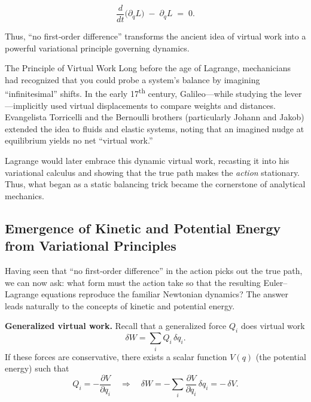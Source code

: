 \[
\frac{d}{dt}\!\bigl(\partial_{\dot q}L\bigr)
\;-\;\partial_{q}L
\;=\;
0.
\]

Thus, “no first‐order difference” transforms the ancient idea of virtual work into a powerful variational principle governing dynamics.  



\medskip

\begin{HistoricalSidebar}{The Principle of Virtual Work}
  Long before the age of Lagrange, mechanicians had recognized that you could probe a system’s balance by 
  imagining “infinitesimal” shifts.  In the early 17\textsuperscript{th} century, Galileo—while studying 
  the lever—implicitly used virtual displacements to compare weights and distances.  Evangelista Torricelli 
  and the Bernoulli brothers (particularly Johann and Jakob) extended the idea to fluids and elastic 
  systems, noting that an imagined nudge at equilibrium yields no net “virtual work.”  

  \medskip

  Lagrange would later embrace this dynamic virtual work, recasting it into his variational calculus and 
  showing that the true path makes the \emph{action} stationary.  Thus, what began as a static balancing 
  trick became the cornerstone of analytical mechanics.
\end{HistoricalSidebar}



\subsection{Emergence of Kinetic and Potential Energy from Variational Principles}

Having seen that “no first‐order difference” in the action picks out the true path, we can now ask: what form must the action take so that the resulting Euler–Lagrange equations reproduce the familiar Newtonian dynamics?  The answer leads naturally to the concepts of kinetic and potential energy.

\medskip

\noindent\textbf{Generalized virtual work.}  Recall that a generalized force \(Q_{i}\) does virtual work
\[
\delta W = \sum_{i} Q_{i}\,\delta q_{i}.
\]
If these forces are conservative, there exists a scalar function \(V(q)\) (the potential energy) such that
\[
Q_{i} = -\frac{\partial V}{\partial q_{i}}
\quad\Longrightarrow\quad
\delta W = -\sum_{i} \frac{\partial V}{\partial q_{i}}\,\delta q_{i}
= -\,\delta V.
\]

